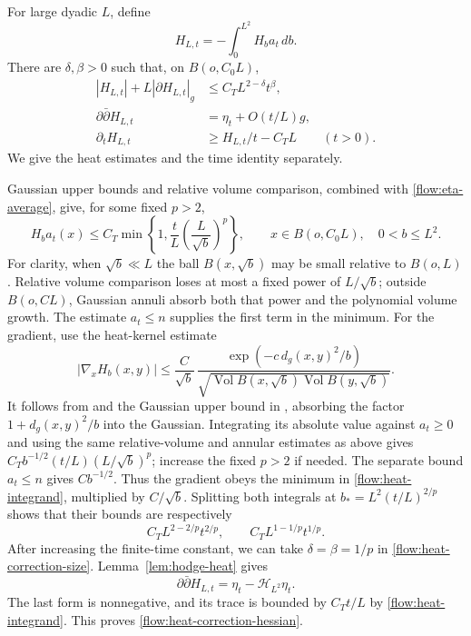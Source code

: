 \documentclass[11pt]{article}
\theoremstyle{definition}
\theoremstyle{remark}
\newcommand{\dd}{\partial\bar\partial}
\DeclareMathOperator{\Vol}{Vol}
\numberwithin{equation}{section}
\begin{document}
For large dyadic $L$, define
\[
 H_{L,t}=-\int_0^{L^2}H_ba_t\,db.
\]
There are $\delta,\beta>0$ such that, on $B(o,C_0L)$,
\begin{align}
 |H_{L,t}|+L|\partial H_{L,t}|_g
     &\le C_TL^{2-\delta}t^\beta,
                  \label{flow:heat-correction-size}\\
 \dd H_{L,t}&=\eta_t+O(t/L)g,
                  \label{flow:heat-correction-hessian}\\
 \partial_tH_{L,t}&\ge H_{L,t}/t-C_TL
                  \qquad(t>0).
                  \label{flow:heat-correction-time}
\end{align}
We give the heat estimates and the time identity separately.

Gaussian upper bounds and relative volume comparison, combined with
\eqref{flow:eta-average}, give, for some fixed $p>2$,
\begin{equation}\label{flow:heat-integrand}
 H_ba_t(x)\le
 C_T\min\left\{1,\frac{t}{L}\left(\frac{L}{\sqrt b}\right)^p\right\},
 \qquad x\in B(o,C_0L),\quad0<b\le L^2.
\end{equation}
For clarity, when $\sqrt b\ll L$ the ball $B(x,\sqrt b)$ may be
small relative to $B(o,L)$.  Relative volume comparison loses at
most a fixed power of $L/\sqrt b$; outside $B(o,CL)$, Gaussian
annuli absorb both that power and the polynomial volume growth.
The estimate $a_t\le n$ supplies the first term in the minimum.
For the gradient, use the heat-kernel estimate
\[
 |\nabla_xH_b(x,y)|
 \le \frac{C}{\sqrt b}\,
 \frac{\exp(-c\,d_g(x,y)^2/b)}
 {\sqrt{\Vol B(x,\sqrt b)\Vol B(y,\sqrt b)}}.
\]
It follows from \cite[Theorem~1.3, equation~(1.6)]{SoupletZhang}
and the Gaussian upper bound in \cite[Corollary~3.1]{LiYau},
absorbing the factor $1+d_g(x,y)^2/b$ into the Gaussian.
Integrating its absolute value against $a_t\ge0$ and using the same
relative-volume and annular estimates as above gives
$C_Tb^{-1/2}(t/L)(L/\sqrt b)^p$; increase the fixed $p>2$ if needed.
The separate bound $a_t\le n$ gives $Cb^{-1/2}$.
Thus the gradient obeys the minimum in
\eqref{flow:heat-integrand}, multiplied by $C/\sqrt b$.
Splitting both integrals at
$b_*=L^2(t/L)^{2/p}$ shows that their bounds are respectively
\[
 C_TL^{2-2/p}t^{2/p},\qquad
 C_TL^{1-1/p}t^{1/p}.
\]
After increasing the finite-time constant, we can take
$\delta=\beta=1/p$ in \eqref{flow:heat-correction-size}.
Lemma~\ref{lem:hodge-heat} gives
\[
 \dd H_{L,t}=\eta_t-\mathcal H_{L^2}\eta_t.
\]
The last form is nonnegative, and its trace is bounded by $C_Tt/L$
by \eqref{flow:heat-integrand}.  This proves
\eqref{flow:heat-correction-hessian}.
\end{document}
